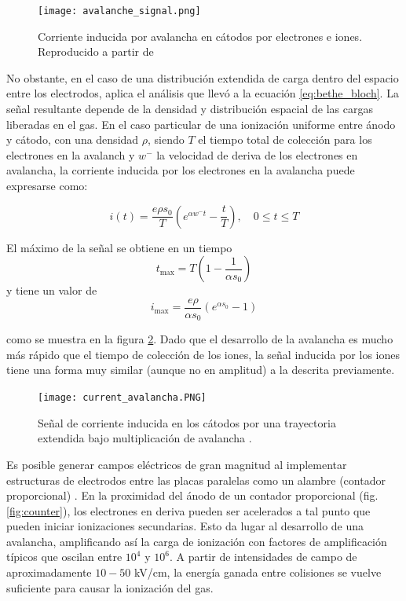 \documentclass{article}
\begin{document}
\begin{figure}[H]
    \centering
    \texttt{[image: avalanche\_signal.png]}
    \caption{Corriente inducida por avalancha en cátodos por electrones e iones. Reproducido a partir de \cite{sauli2015gaseous3}}
    \label{fig:avalanche_signal}
\end{figure}

\noindent No obstante, en el caso de una distribución extendida de carga dentro del espacio entre los electrodos, aplica el análisis que llevó a la ecuación \ref{eq:bethe_bloch}. La señal resultante depende de la densidad y distribución espacial de las cargas liberadas en el gas. En el caso particular de una ionización uniforme entre ánodo y cátodo, con una densidad \( \rho \), siendo $T$ el tiempo total de colección para los electrones en la avalanch y $w^-$ la velocidad de deriva de los electrones en avalancha, la corriente inducida por los electrones en la avalancha puede expresarse como:

\begin{equation}
i(t) = \frac{e \rho s_0}{T} \left( e^{\alpha w^- t} - \frac{t}{T} \right), \quad 0 \leq t \leq T
\end{equation}

El máximo de la señal se obtiene en un tiempo 
\begin{equation}
t_{\text{max}} = T \left( 1 - \frac{1}{\alpha s_0} \right)
\end{equation}
y tiene un valor de 
\begin{equation}
i_{\text{max}} = \frac{e \rho}{\alpha s_0} \left( e^{\alpha s_0} - 1 \right)
\end{equation}

\noindent como se muestra en la figura \ref{fig:current_avalancha}. Dado que el desarrollo de la avalancha es mucho más rápido que el tiempo de colección de los iones, la señal inducida por los iones tiene una forma muy similar (aunque no en amplitud) a la descrita previamente.

\begin{figure}[H]
    \centering
    \texttt{[image: current\_avalancha.PNG]}
    \caption{Señal de corriente inducida en los cátodos por una trayectoria extendida bajo multiplicación de avalancha \cite{sauli2015gaseous5}.}
    \label{fig:current_avalancha}
\end{figure}

\noindent Es posible generar campos eléctricos de gran magnitud al implementar estructuras de electrodos entre las placas paralelas como un alambre (contador proporcional) \cite{montgomery1941geiger}. En la proximidad del ánodo de un contador proporcional (fig. \ref{fig:counter}), los electrones en deriva pueden ser acelerados a tal punto que pueden iniciar ionizaciones secundarias. Esto da lugar al desarrollo de una avalancha, amplificando así la carga de ionización con factores de amplificación típicos que oscilan entre \(10^4\) y \(10^6\). A partir de intensidades de campo de aproximadamente \(10-50\) kV/cm, la energía ganada entre colisiones se vuelve suficiente para causar la ionización del gas.\\
\end{document}
